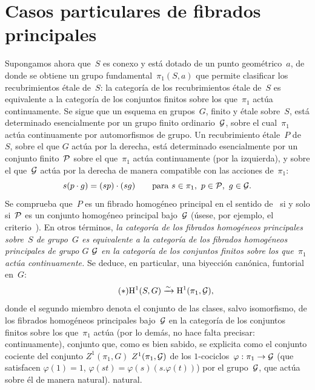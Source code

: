 
\section{Casos particulares de fibrados principales}
\label{XI.5}

Supongamos ahora que~$S$ es conexo y está dotado de un punto
geométrico~$a$, de donde se obtiene un grupo fundamental~$\pi_1(S,a)$ que
permite clasificar los recubrimientos étale de~$S$: la categoría de los
recubrimientos étale de~$S$ es equivalente a la categoría de los conjuntos
finitos sobre los que~$\pi_1$ actúa continuamente. Se sigue que un esquema
en grupos~$G$, finito y étale sobre~$S$, está determinado esencialmente por
un grupo finito ordinario~$\cal{G}$, sobre el cual~$\pi_1$ actúa continuamente
por automorfismos de grupo. Un recubrimiento étale~$P$ de~$S$, sobre el que
$G$ actúa por la derecha, está determinado esencialmente por un conjunto
finito~$\cal{P}$ sobre el que~$\pi_1$ actúa continuamente (por la izquierda),
y sobre el que~$\cal{G}$ actúa por la derecha de manera compatible con las
acciones de~$\pi_1$:
$$
s(p\cdot g)=(sp)\cdot(sg)\qquad \text{para }s\in\pi_1,\
p\in\cal{P},\ g\in\cal{G}.
$$
Se comprueba que~$P$ es un fibrado homogéneo principal en el sentido
de~\Ref{XI.4.1} si y solo si~$\cal{P}$ es un conjunto homogéneo principal
bajo~$\cal{G}$ (úsese, por ejemplo, el criterio~\Ref{XI.4.2}). En otros
términos, \emph{la categoría de los fibrados homogéneos principales sobre~$S$
de grupo~$G$ es equivalente a la categoría de los fibrados homogéneos
principales de grupo
{$G$}
{$\cal G$}
en la categoría de los conjuntos finitos sobre los que~$\pi_1$ actúa
continuamente.} Se deduce, en particular, una biyección canónica, funtorial
en~$G$:
\begin{equation*}
\label{eq:XI.5.etoile}
\tag{$*$} \H^1(S,G)\isomto \H^1(\pi_1,\cal{G})\quoi,
\end{equation*}
donde
el segundo miembro denota el conjunto de las clases, salvo isomorfismo, de
los fibrados homogéneos principales bajo~$\cal{G}$ en la categoría de los
conjuntos finitos sobre los que~$\pi_1$ actúa (por lo demás, no hace falta
precisar: continuamente), conjunto que, como es bien sabido, se explicita
como el conjunto cociente del conjunto
{$Z^1(\pi_1,G)$}
{$Z^1(\pi_1,\cal G)$}
de los $1$-cociclos~$\varphi:\pi_1\to \cal{G}$ (que satisfacen
$\varphi(1)=1$, $\varphi(st)=\varphi(s)(s.\varphi(t))$) por el grupo~$\cal{G}$,
que actúa sobre él de manera
{natural).}
{natural.}

